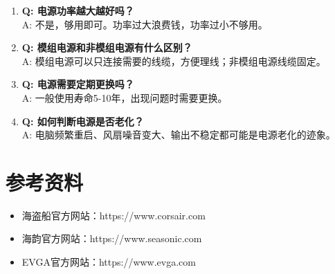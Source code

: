 \documentclass[12pt,UTF8]{ctexbook}
\begin{document}
\begin{enumerate}
    \item \textbf{Q: 电源功率越大越好吗？}
    \\A: 不是，够用即可。功率过大浪费钱，功率过小不够用。
    
    \item \textbf{Q: 模组电源和非模组电源有什么区别？}
    \\A: 模组电源可以只连接需要的线缆，方便理线；非模组电源线缆固定。
    
    \item \textbf{Q: 电源需要定期更换吗？}
    \\A: 一般使用寿命5-10年，出现问题时需要更换。
    
    \item \textbf{Q: 如何判断电源是否老化？}
    \\A: 电脑频繁重启、风扇噪音变大、输出不稳定都可能是电源老化的迹象。
\end{enumerate}

\chapter{参考资料}

\begin{itemize}[leftmargin=2em]
    \item 海盗船官方网站：https://www.corsair.com
    \item 海韵官方网站：https://www.seasonic.com
    \item EVGA官方网站：https://www.evga.com
\end{itemize}

\backmatter
\end{document}
